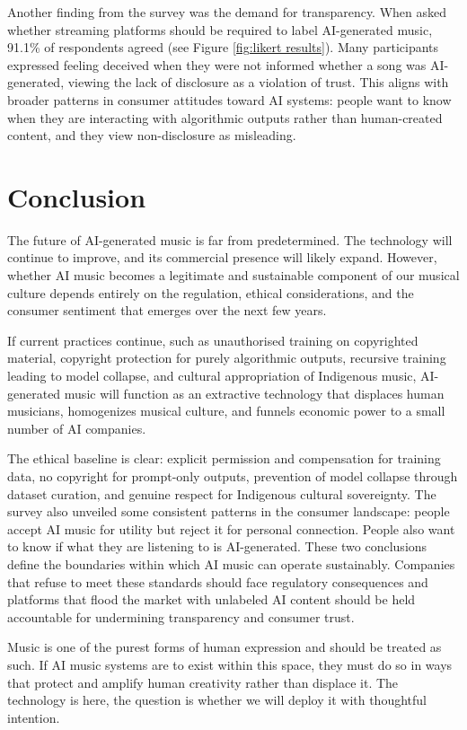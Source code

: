 \documentclass{article}
\begin{document}
Another finding from the survey was the demand for transparency. When asked whether streaming platforms should be required to label AI-generated music, 91.1\% of respondents agreed (see Figure \ref{fig:likert results}). Many participants expressed feeling deceived when they were not informed whether a song was AI-generated, viewing the lack of disclosure as a violation of trust. This aligns with broader patterns in consumer attitudes toward AI systems: people want to know when they are interacting with algorithmic outputs rather than human-created content, and they view non-disclosure as misleading.

\section{Conclusion}

The future of AI-generated music is far from predetermined. The technology will continue to improve, and its commercial presence will likely expand. However, whether AI music becomes a legitimate and sustainable component of our musical culture depends entirely on the regulation, ethical considerations, and the consumer sentiment that emerges over the next few years.

If current practices continue, such as unauthorised training on copyrighted material, copyright protection for purely algorithmic outputs, recursive training leading to model collapse, and cultural appropriation of Indigenous music, AI-generated music will function as an extractive technology that displaces human musicians, homogenizes musical culture, and funnels economic power to a small number of AI companies. 

The ethical baseline is clear: explicit permission and compensation for training data, no copyright for prompt-only outputs, prevention of model collapse through dataset curation, and genuine respect for Indigenous cultural sovereignty. The survey also unveiled some consistent patterns in the consumer landscape: people accept AI music for utility but reject it for personal connection. People also want to know if what they are listening to is AI-generated. These two conclusions define the boundaries within which AI music can operate sustainably. Companies that refuse to meet these standards should face regulatory consequences and platforms that flood the market with unlabeled AI content should be held accountable for undermining transparency and consumer trust.

Music is one of the purest forms of human expression and should be treated as such. If AI music systems are to exist within this space, they must do so in ways that protect and amplify human creativity rather than displace it. The technology is here, the question is whether we will deploy it with thoughtful intention.
    




\end{document}

